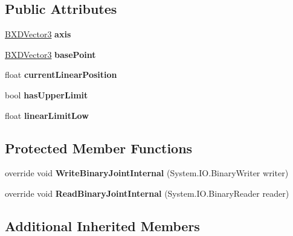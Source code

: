 \subsection*{Public Attributes}
\begin{DoxyCompactItemize}
\item 
\mbox{\label{class_linear_joint___base_af77df381d0982fc36cbc860c83a0369c}} 
\hyperlink{class_b_x_d_vector3}{B\+X\+D\+Vector3} {\bfseries axis}
\item 
\mbox{\label{class_linear_joint___base_ad47a28d207f59657b61459a159f3713e}} 
\hyperlink{class_b_x_d_vector3}{B\+X\+D\+Vector3} {\bfseries base\+Point}
\item 
\mbox{\label{class_linear_joint___base_a47a73895af84d844551e4971b9cd9f2f}} 
float {\bfseries current\+Linear\+Position}
\item 
\mbox{\label{class_linear_joint___base_ad31711ee82f570a735aa9f472411dc18}} 
bool {\bfseries has\+Upper\+Limit}
\item 
\mbox{\label{class_linear_joint___base_a196c4ea3d84b5e0c787a4668b4f7e682}} 
float {\bfseries linear\+Limit\+Low}
\end{DoxyCompactItemize}
\subsection*{Protected Member Functions}
\begin{DoxyCompactItemize}
\item 
\mbox{\label{class_linear_joint___base_a132d39963128ea2f94e7c3de6065746b}} 
override void {\bfseries Write\+Binary\+Joint\+Internal} (System.\+I\+O.\+Binary\+Writer writer)
\item 
\mbox{\label{class_linear_joint___base_ac2daa8ce486de04d24af7dc6cfc289d8}} 
override void {\bfseries Read\+Binary\+Joint\+Internal} (System.\+I\+O.\+Binary\+Reader reader)
\end{DoxyCompactItemize}
\subsection*{Additional Inherited Members}


